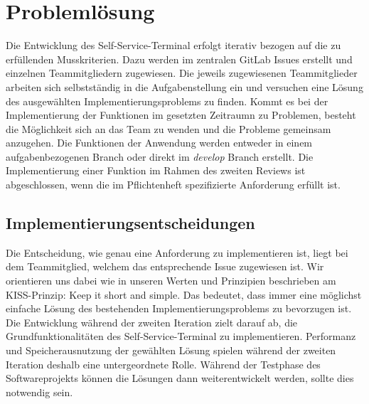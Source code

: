 \section{Problemlösung}
Die Entwicklung des Self-Service-Terminal erfolgt iterativ bezogen auf die zu erfüllenden Musskriterien. Dazu werden im zentralen GitLab Issues erstellt und einzelnen Teammitgliedern zugewiesen. Die jeweils zugewiesenen Teammitglieder arbeiten sich selbstständig in die Aufgabenstellung ein und versuchen eine Lösung des ausgewählten Implementierungsproblems zu finden. Kommt es bei der Implementierung der Funktionen im gesetzten Zeitraumn zu Problemen, besteht die Möglichkeit sich an das Team zu wenden und die Probleme gemeinsam anzugehen. Die Funktionen der Anwendung werden entweder in einem aufgabenbezogenen Branch oder direkt im \textit{develop} Branch erstellt. Die Implementierung einer Funktion im Rahmen des zweiten Reviews ist abgeschlossen, wenn die im Pflichtenheft spezifizierte Anforderung erfüllt ist.\par
\vspace{1cm}

\subsection{Implementierungsentscheidungen}
Die Entscheidung, wie genau eine Anforderung zu implementieren ist, liegt bei dem Teammitglied, welchem das entsprechende Issue zugewiesen ist. Wir orientieren uns dabei wie in unseren Werten und Prinzipien beschrieben am KISS-Prinzip: \glqq Keep it short and simple\grqq{}. Das bedeutet, dass immer eine möglichst einfache Lösung des bestehenden Implementierungsproblems zu bevorzugen ist. Die Entwicklung während der zweiten Iteration zielt darauf ab, die Grundfunktionalitäten des Self-Service-Terminal zu implementieren. Performanz und Speicherausnutzung der gewählten Lösung spielen während der zweiten Iteration deshalb eine untergeordnete Rolle. Während der Testphase des Softwareprojekts können die Lösungen dann weiterentwickelt werden, sollte dies notwendig sein.
